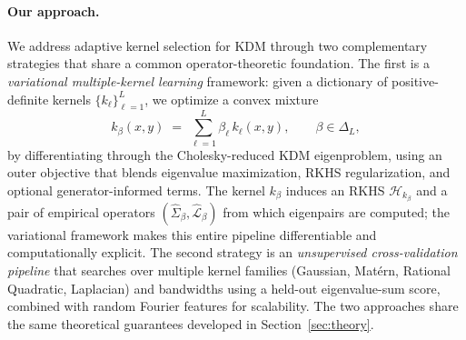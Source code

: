 \documentclass[11pt]{article}
\theoremstyle{remark}
\newcommand{\Hk}{\mathcal{H}}
\begin{document}
\paragraph{Our approach.}
We address adaptive kernel selection for KDM through two complementary strategies that share a common operator-theoretic foundation.
The first is a \emph{variational multiple-kernel learning} framework: given a dictionary of positive-definite kernels $\{k_\ell\}_{\ell=1}^L$, we optimize a convex mixture
\begin{equation}
k_\beta(x,y) \;=\; \sum_{\ell=1}^L \beta_\ell\, k_\ell(x,y), \qquad \beta \in \Delta_L,
\label{eq:kernel-mixture}
\end{equation}
by differentiating through the Cholesky-reduced KDM eigenproblem, using an outer objective that blends eigenvalue maximization, RKHS regularization, and optional generator-informed terms.
The kernel $k_\beta$ induces an RKHS $\Hk_{k_\beta}$ and a pair of empirical operators $(\widehat\Sigma_\beta,\widehat{\mathcal{L}}_\beta)$ from which eigenpairs are computed; the variational framework makes this entire pipeline differentiable and computationally explicit.
The second strategy is an \emph{unsupervised cross-validation pipeline} that searches over multiple kernel families (Gaussian, Mat\'ern, Rational Quadratic, Laplacian) and bandwidths using a held-out eigenvalue-sum score, combined with random Fourier features for scalability.
The two approaches share the same theoretical guarantees developed in Section~\ref{sec:theory}.
\end{document}
